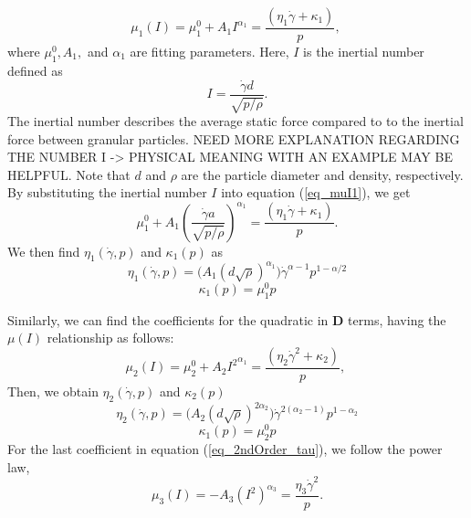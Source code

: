 \begin{equation}
    \mu_1(I) = \mu_1^0 + A_1{ I}^{ \alpha_1} =  \frac{(\eta_1 \dot{\gamma} + \kappa_1)}{p},\
\label{eq_muI1}
\end{equation}
where $\mu_1^0, A_1,$ and $\alpha_1$ are fitting parameters. 
Here, $I$ is the inertial number defined as 
\[
  I =  \frac{\dot{\gamma} d }{\sqrt{p/\rho}}.
\]
The inertial number describes the average static force compared to to the inertial force between granular particles. {\color{blue} NEED MORE EXPLANATION REGARDING THE NUMBER I -> PHYSICAL MEANING WITH AN EXAMPLE MAY BE HELPFUL.}
Note that $d$ and $\rho$ are the particle diameter and density, respectively.
By substituting the inertial number $I$ into equation (\ref{eq_muI1}), we get
\begin{equation}
     \mu_1^0 + A_1 {\left(  \frac{\dot{\gamma} a }{\sqrt{p/\rho}}\right) }^{ \alpha_1} =  \frac{(\eta_1 \dot{\gamma} + \kappa_1)}{p}.
\end{equation}
We then find $\eta_1 (\dot{\gamma}, p)$ and $\kappa_1(p)$ as
\begin{equation}
    \eta_1  (\dot{\gamma}, p)= 
    \biggl( A_1 {\left(   d  \sqrt{\rho} \right) }^{ \alpha_1}\biggr) 
     \dot{\gamma}^{\alpha-1} p^{1-\alpha/2}
\label{eq_eta1}
\end{equation}
\begin{equation}
    \kappa_1(p) = \mu_1^0 p
\label{eq_kappa1}
\end{equation}
\par
Similarly, we can find the coefficients for the quadratic in ${\bm D}$ terms, having the $\mu(I)$ relationship as follows:
\begin{equation}
    \mu_2(I) = \mu_2^0 + A_2{ I^2}^{ \alpha_1} =  \frac{(\eta_2 \dot{\gamma}^2 + \kappa_2)}{p},\
\label{eq_muI2}
\end{equation}
Then, we obtain $\eta_2 (\dot{\gamma}, p)$ and $\kappa_2(p)$
\begin{equation}
    \eta_2  (\dot{\gamma}, p)= 
    \biggl( A_2 {\left(   d  \sqrt{\rho} \right) }^{ 2\alpha_2}\biggr) 
     {\dot{\gamma}}^{2(\alpha_2-1)} p^{1-\alpha_2}
\label{eq_eta2}
\end{equation}
\begin{equation}
    \kappa_1(p) = \mu_2^0 p
\label{eq_kappa2}
\end{equation}
For the last coefficient in equation (\ref{eq_2ndOrder_tau}), we follow the power law, 
\begin{equation}
    \mu_3(I) = -A_3 \left( I^2 \right)^{\alpha_3} = \frac{\eta_3 \dot{\gamma}^2}{p}.
\label{eq_muI3}
\end{equation}
